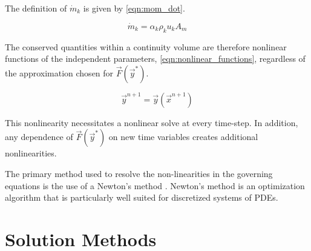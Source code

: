 The definition of $\dot{m}_k$ is given by \eqref{eqn:mom_dot}.

\begin{equation}
\label{eqn:mom_dot}
\dot{m}_k = \alpha_k \rho_k u_k A_m
\end{equation}

The conserved quantities within a continuity volume are therefore nonlinear functions of the independent parameters, \eqref{eqn:nonlinear_functions}, regardless of the approximation chosen for $\vec{F}(\vec{y}^{*})$.

\begin{equation}
\label{eqn:nonlinear_functions}
\vec{y}^{n+1} = \vec{y}(\vec{x}^{n+1})
\end{equation}

This nonlinearity necessitates a nonlinear solve at every time-step.
In addition, any dependence of $\vec{F}(\vec{y}^{*})$ on new time variables creates additional nonlinearities.

The primary method used to resolve the non-linearities in the governing equations is the use of a Newton's method \cite{Deuflhard2004}.
Newton's method is an optimization algorithm that is particularly well suited for discretized systems of PDEs.



\section{Solution Methods}
\label{sect:solution_techniques}

